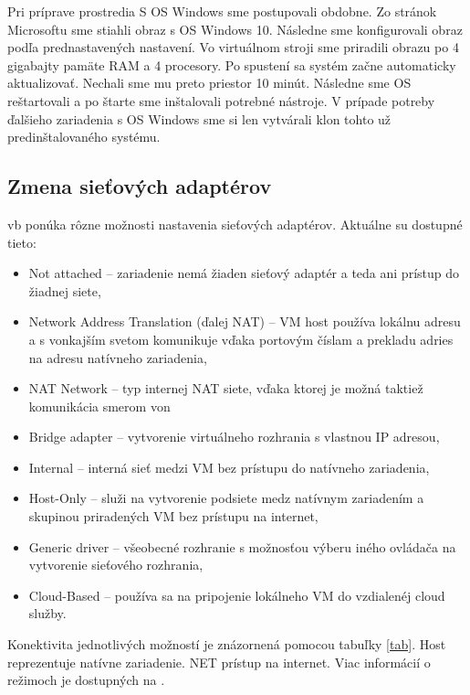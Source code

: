Pri príprave prostredia S OS Windows sme postupovali obdobne. Zo stránok Microsoftu sme stiahli obraz s OS Windows 10. Následne sme konfigurovali obraz podľa prednastavených nastavení. Vo virtuálnom stroji sme priradili obrazu po 4 gigabajty pamäte RAM a 4 procesory. Po spustení sa systém začne automaticky aktualizovať. Nechali sme mu preto priestor 10 minút. Následne sme OS reštartovali a po štarte sme inštalovali potrebné nástroje. V prípade potreby ďalšieho zariadenia s OS Windows sme si len vytvárali klon tohto už predinštalovaného systému.

\subsection{Zmena sieťových adaptérov}
\acrshort{vb} ponúka rôzne možnosti nastavenia sieťových adaptérov. Aktuálne su dostupné tieto:
\begin{itemize}
	\item{Not attached} -- zariadenie nemá žiaden sieťový adaptér a teda ani prístup do žiadnej siete,
	\item{Network Address Translation (ďalej NAT)} -- VM host používa lokálnu adresu a s vonkajším svetom komunikuje vďaka portovým číslam a prekladu adries na adresu natívneho zariadenia,
	\item{NAT Network} -- typ internej NAT siete, vďaka ktorej je možná taktiež komunikácia smerom von
	\item{Bridge adapter} -- vytvorenie virtuálneho rozhrania s vlastnou IP adresou,
	\item{Internal} -- interná sieť medzi VM bez prístupu do natívneho zariadenia,
	\item{Host-Only} -- služi na vytvorenie podsiete medz natívnym zariadením a skupinou priradených VM bez prístupu na internet,
	\item{Generic driver} -- všeobecné rozhranie s možnosťou výberu iného ovládača na vytvorenie sieťového rozhrania,
	\item{Cloud-Based} -- používa sa na pripojenie lokálneho VM do vzdialenéj cloud služby.
\end{itemize} 

Konektivita jednotlivých možností je znázornená pomocou tabuľky \ref{tab}. Host reprezentuje natívne zariadenie. NET prístup na internet. Viac informácií o režimoch je dostupných na \cite{vboracle}.

